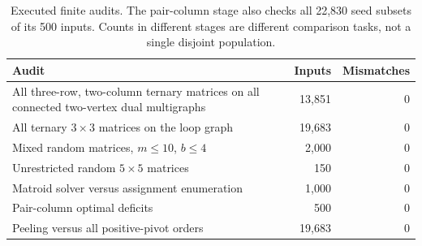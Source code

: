 \begin{table}[htbp]\centering\small
\begin{tabular}{p{3.7in}rr}\toprule
Audit & Inputs & Mismatches\\\midrule
All three-row, two-column ternary matrices on all connected two-vertex dual multigraphs & 13,851 & 0\\
All ternary $3\times3$ matrices on the loop graph & 19,683 & 0\\
Mixed random matrices, $m\le10$, $b\le4$ & 2,000 & 0\\
Unrestricted random $5\times5$ matrices & 150 & 0\\
Matroid solver versus assignment enumeration & 1,000 & 0\\
Pair-column optimal deficits & 500 & 0\\
Peeling versus all positive-pivot orders & 19,683 & 0\\
\bottomrule\end{tabular}
\caption{Executed finite audits. The pair-column stage also checks all 22,830 seed subsets of its 500 inputs. Counts in different stages are different comparison tasks, not a single disjoint population.}
\end{table}
